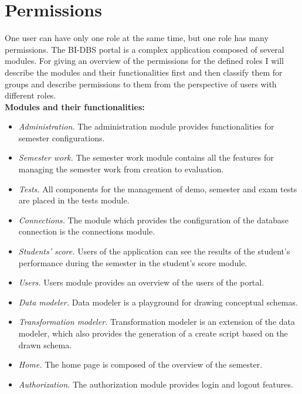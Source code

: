 \section{Permissions} One user can have only one role at the same time, but one role has many permissions. The BI-DBS portal is a complex application composed of several modules. For giving an overview of the permissions for the defined roles I will describe the modules and their functionalities first and then classify them for groups and describe permissions to them from the perspective of users with different roles.\\

\noindent \textbf{Modules and their functionalities:}

\begin{itemize}
    \item \emph{Administration.} The administration module provides functionalities for semester configurations. 
    \item \emph{Semester work.} The semester work module contains all the features for managing the semester work from creation to evaluation.
    \item \emph{Tests.} All components for the management of demo, semester and exam tests are placed in the tests module.
    \item \emph{Connections.} The module which provides the configuration of the database connection is the connections module.
    \item \emph{Students' score.} Users of the application can see the results of the student's performance during the semester in the student's score module.
    \item \emph{Users.} Users module provides an overview of the users of the portal.
    \item \emph{Data modeler.} Data modeler is a playground for drawing conceptual schemas.
    \item \emph{Transformation modeler.} Transformation modeler is an extension of the data modeler, which also provides the generation of a create script based on the drawn schema.
    \item \emph{Home.} The home page is composed of the overview of the semester.
    \item \emph{Authorization.} The authorization module provides login and logout features.

\end{itemize}

\vspace{0.4cm}

